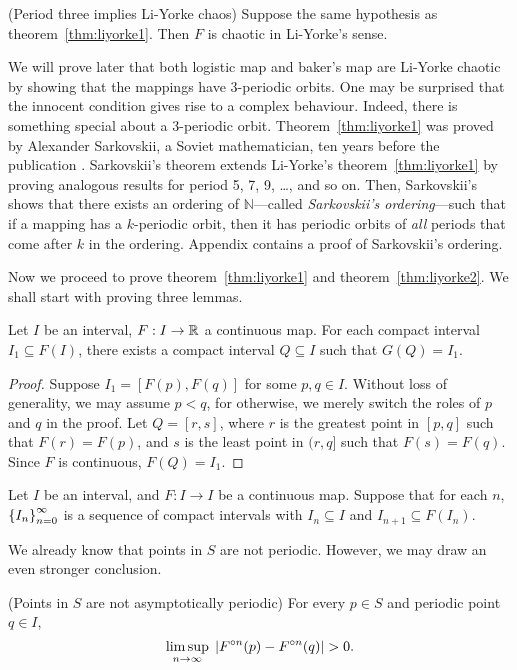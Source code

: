 \documentclass[12pt,draft,twoside]{book}
\begin{document}
\begin{theorem}
  (Period three implies Li-Yorke chaos)
  Suppose the same hypothesis as theorem~\ref{thm:liyorke1}.
  Then $F$ is chaotic in Li-Yorke's sense.
  \label{thm:liyorke2}
\end{theorem}

We will prove later that both logistic map and baker's map are Li-Yorke chaotic by showing that the mappings have 3-periodic orbits.
One may be surprised that the innocent condition gives rise to a complex behaviour.
Indeed, there is something special about a 3-periodic orbit.
Theorem~\ref{thm:liyorke1} was proved by Alexander Sarkovskii, a Soviet mathematician, ten years before the publication \citep{sarkovskii}.
Sarkovskii's theorem extends Li-Yorke's theorem~\ref{thm:liyorke1} by proving analogous results for period 5, 7, 9, \ldots, and so on.
Then, Sarkovskii's shows that there exists an ordering of $\mathbb{N}$---called \textit{Sarkovskii's ordering}---such that if a mapping has a $k$-periodic orbit, then it has periodic orbits of \textit{all} periods that come after $k$ in the ordering.
Appendix contains a proof of Sarkovskii's ordering.

Now we proceed to prove theorem~\ref{thm:liyorke1} and theorem~\ref{thm:liyorke2}.
We shall start with proving three lemmas.

\begin{lemma}
  Let $I$ be an interval, $F: I \to \mathbb{R}$ a continuous map.
  For each compact interval $I_1 \subseteq F(I)$, there exists a compact interval $Q \subseteq I$ such that $G(Q) = I_1$.
  \label{lem:liyorke1}
  \begin{proof}
    Suppose $I_1 = [F(p),F(q)]$ for some $p,q \in I$.
    Without loss of generality, we may assume $p < q$, for otherwise, we merely switch the roles of $p$ and $q$ in the proof.
    Let $Q = [r,s]$, where $r$ is the greatest point in $[p,q]$ such that $F(r) = F(p)$, and $s$ is the least point in $(r,q]$ such that $F(s) = F(q)$.
    Since $F$ is continuous, $F(Q) = I_1$.
  \end{proof}
\end{lemma}

\begin{lemma}
  Let $I$ be an interval, and $F: I\to I$ be a continuous map.
  Suppose that for each $n$, $\left \{ I_n \right \}^{\infty}_{n=0}$ is a sequence of compact intervals with $I_n \subseteq I$ and $I_{n+1} \subseteq F(I_n)$.
  \label{lem:liyorke2}
\end{lemma}

We already know that points in $S$ are not periodic.
However, we may draw an even stronger conclusion.
\begin{theorem}
  (Points in $S$ are not asymptotically periodic)
  For every $p \in S$ and periodic point $q \in I$,
  \begin{equation*}
    \limsup\limits_{n \to \infty}\; \left | F^{\circ n}(p) - F^{\circ n}(q) \right | > 0.
  \end{equation*}
  \label{thm:liyorke3}
\end{theorem}
\end{document}
